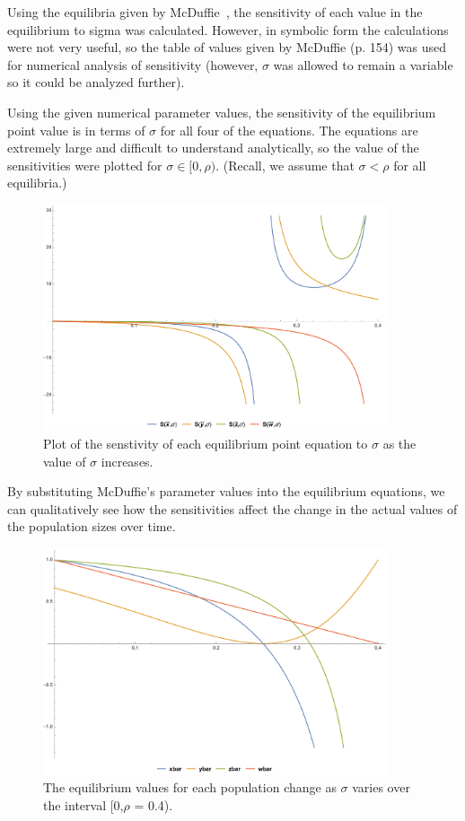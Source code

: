 \documentclass[12pt]{article}
\begin{document}
Using the equilibria given by McDuffie~\cite{mcduffie}, the sensitivity of each value in the equilibrium to sigma was calculated. However, in symbolic form the calculations were not very useful, so the table of values given by McDuffie (p. 154) was used for numerical analysis of sensitivity (however, $\sigma$ was allowed to remain a variable so it could be analyzed further).

Using the given numerical parameter values, the sensitivity of the equilibrium point value is in terms of \(\sigma\) for all four of the equations. The equations are extremely large and difficult to understand analytically, so the value of the sensitivities were plotted for \(\sigma \in [0,\rho)\). (Recall, we assume that \(\sigma<\rho\) for all equilibria.)

\begin{figure}[p]
    \centering
    \includegraphics[width=0.9\textwidth]{SensitivitiesToSigma.pdf}
    \caption{Plot of the senstivity of each equilibrium point equation to \(\sigma\) as the value of \(\sigma\) increases.}
    \label{fig:sensitivitytosigma}
\end{figure}

By substituting McDuffie's parameter values into the equilibrium equations, we can qualitatively see how the sensitivities affect the change in the actual values of the population sizes over time.

\begin{figure}[p]
    \centering
    \includegraphics[width=0.9\textwidth]{ValuesVsSigma.pdf}
    \caption{The equilibrium values for each population change as \(\sigma\) varies over the interval [0,\(\rho\) = 0.4).}
    \label{fig:valuesvssigma}
\end{figure}
\end{document}
